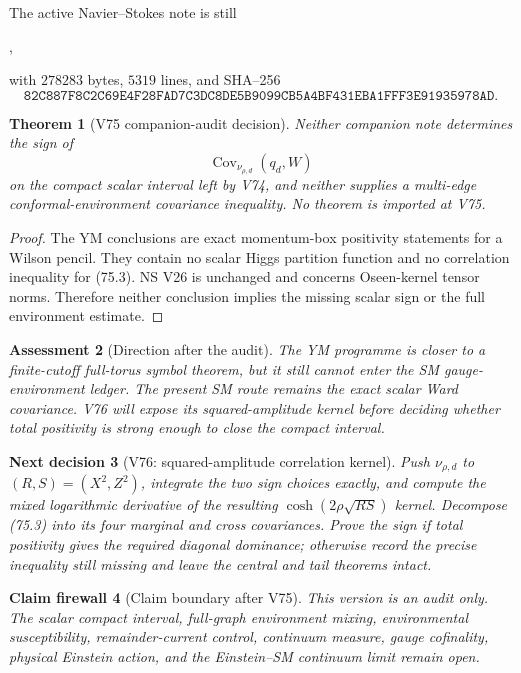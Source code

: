 \documentclass[11pt]{article}
\newtheorem{theorem}{Theorem}[section]
\newtheorem{firewall}[theorem]{Claim firewall}
\newtheorem{decision}[theorem]{Next decision}
\newtheorem{assessment}[theorem]{Assessment}
\theoremstyle{remark}
\begin{document}
The active Navier--Stokes note is still
\begin{center}\small
{},
\end{center}
with \(278283\) bytes, \(5319\) lines, and SHA--256
\[
 \texttt{82C887F8C2C69E4F28FAD7C3DC8DE5B9099CB5A4BF431EBA1FFF3E91935978AD}.
                                                               \tag{75.2}
\]

\begin{theorem}[V75 companion-audit decision]
\label{thm:v17v75-decision}
Neither companion note determines the sign of
\[
 \operatorname{Cov}_{\nu_{\rho,d}}(q_d,W)         \tag{75.3}
\]
on the compact scalar interval left by V74, and neither supplies a
multi-edge conformal-environment covariance inequality.  No theorem is
imported at V75.
\end{theorem}

\begin{proof}
The YM conclusions are exact momentum-box positivity statements for a
Wilson pencil.  They contain no scalar Higgs partition function and no
correlation inequality for (75.3).  NS V26 is unchanged and concerns
Oseen-kernel tensor norms.  Therefore neither conclusion implies the
missing scalar sign or the full environment estimate.
\end{proof}

\begin{assessment}[Direction after the audit]
\label{ass:v17v75-direction}
The YM programme is closer to a finite-cutoff full-torus symbol theorem,
but it still cannot enter the SM gauge-environment ledger.  The present
SM route remains the exact scalar Ward covariance.  V76 will expose its
squared-amplitude kernel before deciding whether total positivity is
strong enough to close the compact interval.
\end{assessment}

\begin{decision}[V76: squared-amplitude correlation kernel]
\label{dec:v17v75-next}
Push \(\nu_{\rho,d}\) to \((R,S)=(X^2,Z^2)\), integrate the two sign
choices exactly, and compute the mixed logarithmic derivative of the
resulting \(\cosh(2\rho\sqrt{RS})\) kernel.  Decompose (75.3) into its
four marginal and cross covariances.  Prove the sign if total
positivity gives the required diagonal dominance; otherwise record the
precise inequality still missing and leave the central and tail
theorems intact.
\end{decision}

\begin{firewall}[Claim boundary after V75]
\label{fire:v17v75}
This version is an audit only.  The scalar compact interval, full-graph
environment mixing, environmental susceptibility, remainder-current
control, continuum measure, gauge cofinality, physical Einstein action,
and the Einstein--SM continuum limit remain open.
\end{firewall}
\end{document}
